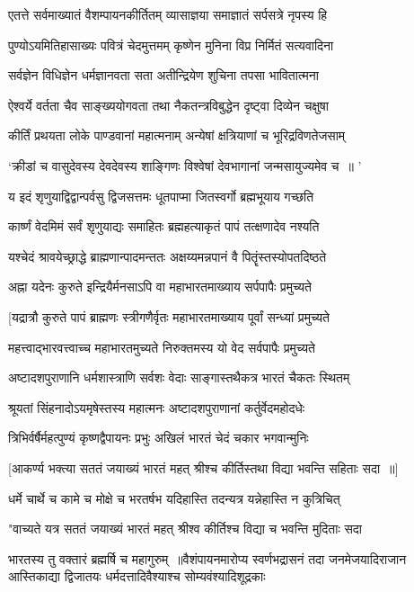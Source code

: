 \twolineshloka
{एतत्ते सर्वमाख्यातं वैशम्पायनकीर्तितम्}
{व्यासाज्ञया समाज्ञातं सर्पसत्रे नृपस्य हि}


\twolineshloka
{पुण्योऽयमितिहासाख्यः पवित्रं चेदमुत्तमम्}
{कृष्णेन मुनिना विप्र निर्मितं सत्यवादिना}


\twolineshloka
{सर्वज्ञेन विधिज्ञेन धर्मज्ञानवता सता}
{अतीन्द्रियेण शुचिना तपसा भावितात्मना}


\twolineshloka
{ऐश्वर्ये वर्तता चैव साङ्ख्ययोगवता तथा}
{नैकतन्त्रविबुद्धेन दृष्ट्वा दिव्येन चक्षुषा}


\twolineshloka
{कीर्तिं प्रथयता लोके पाण्डवानां महात्मनाम्}
{अन्येषां क्षत्रियाणां च भूरिद्रविणतेजसाम्}


\twolineshloka
{`क्रीडां च वासुदेवस्य देवदेवस्य शाङ्गिणः}
{विश्वेषां देवभागानां जन्मसायुज्यमेव च ॥ '}


\twolineshloka
{य इदं शृणुयाद्विद्वान्पर्वसु द्विजसत्तमः}
{धूतपाप्मा जितस्वर्गो ब्रह्मभूयाय गच्छति}


\twolineshloka
{कार्ष्णं वेदमिमं सर्वं शृणुयाद्यः समाहितः}
{ब्रह्महत्याकृतं पापं तत्क्षणादेव नश्यति}


\twolineshloka
{यश्चेदं श्रावयेच्छ्राद्धे ब्राह्मणान्पादमन्ततः}
{अक्षय्यमन्नपानं वै पितॄंस्तस्योपतदिष्ठते}


\twolineshloka
{अह्ना यदेनः कुरुते इन्द्रियैर्मनसाऽपि वा}
{महाभारतमाख्याय सर्पपापैः प्रमुच्यते}


\twolineshloka
{[यद्रात्रौ कुरुते पापं ब्राह्मणः स्त्रीगणैर्वृतः}
{महाभारतमाख्याय पूर्वां सन्ध्यां प्रमुच्यते}


\twolineshloka
{महत्त्वाद्भारवत्त्वाच्च महाभारतमुच्यते}
{निरुक्तमस्य यो वेद सर्वपापैः प्रमुच्यते}


\twolineshloka
{अष्टादशपुराणानि धर्मशास्त्राणि सर्वशः}
{वेदाः साङ्गास्तथैकत्र भारतं चैकतः स्थितम्}


\twolineshloka
{श्रूयतां सिंहनादोऽयमृषेस्तस्य महात्मनः}
{अष्टादशपुराणानां कर्तुर्वेदमहोदधेः}


\twolineshloka
{त्रिभिर्वर्षैर्महत्पुण्यं कृष्णद्वैपायनः प्रभुः}
{अखिलं भारतं चेदं चकार भगवान्मुनिः}


\twolineshloka
{[आकर्ण्य भक्त्या सततं जयाख्यं भारतं महत्}
{श्रीश्च कीर्तिस्तथा विद्या भवन्ति सहिताः सदा ॥]}


\twolineshloka
{धर्मे चार्थे च कामे च मोक्षे च भरतर्षभ}
{यदिहास्ति तदन्यत्र यन्नेहास्ति न कुत्रिचित्}


\twolineshloka
{"वाच्यते यत्र सततं जयाख्यं भारतं महत्}
{श्रीश्व कीर्तिश्च विद्या च भवन्ति मुदिताः सदा}


भारतस्य तु वक्तारं ब्रह्मर्षि च महागुरुम् ॥वैशंपायनमारोप्य स्वर्णभद्रासनं तदा
\twolineshloka
{जनमेजयादिराजान आस्तिकाद्या द्विजातयः}
{धर्मदत्तादिवैश्याश्च सोम्यवंश्यादिशूद्रकाः}


